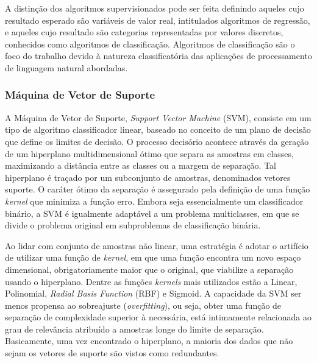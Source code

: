 \documentclass{SBCbookchapter}
\begin{document}
A distinção dos algoritmos supervisionados pode ser feita definindo aqueles cujo resultado esperado são variáveis de valor real, intitulados algoritmos de regressão, e aqueles cujo resultado são categorias representadas por valores discretos, conhecidos como algoritmos de classificação. Algoritmos de classificação são o foco do trabalho devido à natureza classificatória das aplicações de processamento de linguagem natural abordadas.

\subsubsection{Máquina de Vetor de Suporte}
\label{subsubsec:svm}

A Máquina de Vetor de Suporte, \textit{Support Vector Machine} (SVM), consiste em um tipo de algoritmo classificador linear, baseado no conceito de um plano de decisão que define os limites de decisão. O processo decisório acontece através da geração de um hiperplano multidimensional ótimo que separa as amostras em classes, maximizando a distância entre as classes ou a margem de separação. Tal hiperplano é traçado por um subconjunto de amostras, denominados vetores suporte. O caráter ótimo da separação é assegurado pela definição de uma função \textit{kernel} que minimiza a função erro. Embora seja essencialmente um classificador binário, a SVM é igualmente adaptável a um problema multiclasses, em que se divide o problema original em subproblemas de classificação binária.

Ao lidar com conjunto de amostras não linear, uma estratégia é adotar o artifício de utilizar uma função de \textit{kernel}, em que uma função encontra um novo espaço dimensional, obrigatoriamente maior que o original, que viabilize a separação usando o hiperplano. Dentre as funções \textit{kernels} mais utilizados estão a Linear, Polinomial, \textit{Radial Basis Function} (RBF) e Sigmoid. A capacidade da SVM ser menos propensa ao sobreajuste (\textit{overfitting}), ou seja, obter uma função de separação de complexidade superior à necessária, está intimamente relacionada ao grau de relevância atribuído a amostras longe do limite de separação. Basicamente, uma vez encontrado o hiperplano, a maioria dos dados que não sejam os vetores de suporte são vistos como redundantes.
\end{document}
